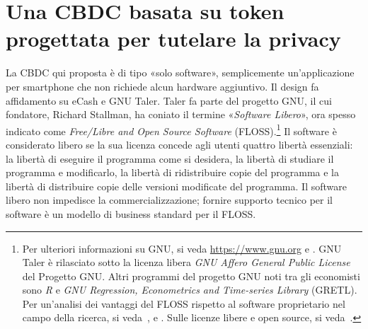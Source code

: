\documentclass{article}
\begin{document}
\section{Una CBDC basata su token progettata per tutelare la privacy}
\label{4.-una-cbdc-basata-su-token-progettata-per-tutelare-la-privacy}

La CBDC qui proposta è di tipo «solo software», semplicemente 
un'applicazione per smartphone che non richiede alcun hardware aggiuntivo. 
Il design fa affidamento su eCash e GNU Taler. Taler fa parte del progetto 
GNU, il cui fondatore, Richard Stallman, ha coniato il termine 
«\emph{Software Libero}», ora spesso indicato come \textit{Free/Libre 
and Open Source Software} (FLOSS).\footnote{Per ulteriori informazioni 
su GNU, si veda \url{https://www.gnu.org} e \cite{Stallman}. GNU Taler 
è rilasciato sotto la licenza libera \textit{GNU Affero General Public 
License} del Progetto GNU. Altri programmi del progetto GNU noti tra gli 
economisti sono \textit{R} e \textit{GNU Regression, Econometrics and 
Time-series Library} (GRETL). Per un'analisi dei vantaggi del FLOSS 
rispetto al software proprietario nel campo della ricerca, si veda~\cite{Baiocchi}, \cite{Yalta2008} e \cite{Yalta2010}. 
Sulle licenze libere e open source, si veda~\cite{Lerner}.} Il software 
è considerato libero se la sua licenza concede agli utenti quattro libertà 
essenziali: la libertà di eseguire il programma come si desidera, la 
libertà di studiare il programma e modificarlo, la libertà di ridistribuire 
copie del programma e la libertà di distribuire copie delle versioni 
modificate del programma. Il software libero non impedisce la 
commercializzazione; fornire supporto tecnico per il software è un modello 
di business standard per il FLOSS.
\end{document}
